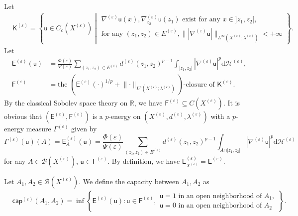 \documentclass[11pt,a4paper]{article}
\numberwithin{equation}{section}
\theoremstyle{plain}
\theoremstyle{definition}
\begin{document}
Let
\begin{align*}
&\mathsf{K}^{(\varepsilon)}=\left\{\mathsf{u}\in C_c(X^{(\varepsilon)})\middle|
\begin{array}{l}
\nabla^{(\varepsilon)}\mathsf{u}(x),\nabla^{(\varepsilon)}_{z_2}\mathsf{u}(z_1)\text{ exist for any }x\in ]z_1,z_2[,\\
\text{for any }(z_1,z_2)\in E^{(\varepsilon)},\lVert {|\nabla^{(\varepsilon)}\mathsf{u}|}\rVert_{L^\infty(X^{(\varepsilon)};\lambda^{(\varepsilon)})}<+\infty
\end{array}
\right\}.
\end{align*}
Let
\begin{align*}
\mathsf{E}^{(\varepsilon)}(\mathsf{u})&=\frac{\Phi(\varepsilon)}{\Psi(\varepsilon)}\sum_{(z_1,z_2)\in E^{(\varepsilon)}}d^{(\varepsilon)}(z_1,z_2)^{p-1}\int_{]z_1,z_2[}|\nabla^{(\varepsilon)} \mathsf{u}|^p\mathrm{d}\mathcal{H}^{(\varepsilon)},\\
\mathsf{F}^{(\varepsilon)}&=\text{the }\left(\mathsf{E}^{(\varepsilon)}(\cdot)^{1/p}+\lVert {\cdot}\rVert_{L^p(X^{(\varepsilon)};\lambda^{(\varepsilon)})}\right)\text{-closure of }\mathsf{K}^{(\varepsilon)}.
\end{align*}
By the classical Sobolev space theory on $\mathbb{R}$, we have $\mathsf{F}^{(\varepsilon)}\subseteq C(X^{(\varepsilon)})$. It is obvious that $(\mathsf{E}^{(\varepsilon)},\mathsf{F}^{(\varepsilon)})$ is a $p$-energy on $(X^{(\varepsilon)},d^{(\varepsilon)},\lambda^{(\varepsilon)})$ with a $p$-energy measure $\Gamma^{(\varepsilon)}$ given by
$$\Gamma^{(\varepsilon)}(\mathsf{u})(A)=\mathsf{E}^{(\varepsilon)}_A(\mathsf{u})=\frac{\Phi(\varepsilon)}{\Psi(\varepsilon)}\sum_{(z_1,z_2)\in E^{(\varepsilon)}}d^{(\varepsilon)}(z_1,z_2)^{p-1}\int_{A\cap ]z_1,z_2[}|\nabla^{(\varepsilon)} \mathsf{u}|^p\mathrm{d}\mathcal{H}^{(\varepsilon)}$$
for any $A\in\mathcal{B}(X^{(\varepsilon)})$, $\mathsf{u}\in\mathsf{F}^{(\varepsilon)}$. By definition, we have $\mathsf{E}^{(\varepsilon)}_{X^{(\varepsilon)}}=\mathsf{E}^{(\varepsilon)}$.

Let $A_1,A_2\in\mathcal{B}(X^{(\varepsilon)})$. We define the capacity between $A_1, A_2$ as
\begin{align*}
&\mathsf{cap}^{(\varepsilon)}(A_1,A_2)=\inf\left\{\mathsf{E}^{(\varepsilon)}(\mathsf{u}):\mathsf{u}\in\mathsf{F}^{(\varepsilon)},
\begin{array}{l}
\mathsf{u}=1\text{ in an open neighborhood of }A_1,\\
\mathsf{u}=0\text{ in an open neighborhood of }A_2
\end{array}
\right\}.
\end{align*}
\end{document}
